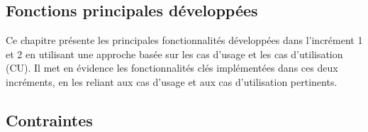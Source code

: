 



\newpage
\subsection{Fonctions principales développées}
Ce chapitre présente les principales fonctionnalités développées dans l'incrément 1 et 2 en utilisant une approche basée sur les cas d'usage et les cas d'utilisation (CU). Il met en évidence les fonctionnalités clés implémentées dans ces deux incréments, en les reliant aux cas d'usage et aux cas d'utilisation pertinents. 











\newpage

\subsection{Contraintes}











\newpage